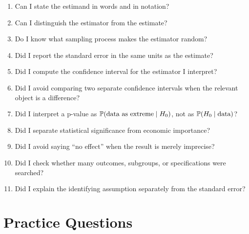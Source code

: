 \begin{enumerate}
  \item Can I state the estimand in words and in notation?
  \item Can I distinguish the estimator from the estimate?
  \item Do I know what sampling process makes the estimator random?
  \item Did I report the standard error in the same units as the estimate?
  \item Did I compute the confidence interval for the estimator I interpret?
  \item Did I avoid comparing two separate confidence intervals when the
  relevant object is a difference?
  \item Did I interpret a p-value as $\mathbb{P}(\text{data as extreme}\mid H_0)$,
  not as $\mathbb{P}(H_0\mid\text{data})$?
  \item Did I separate statistical significance from economic importance?
  \item Did I avoid saying ``no effect'' when the result is merely imprecise?
  \item Did I check whether many outcomes, subgroups, or specifications were
  searched?
  \item Did I explain the identifying assumption separately from the standard
  error?
\end{enumerate}

\section{Practice Questions}

